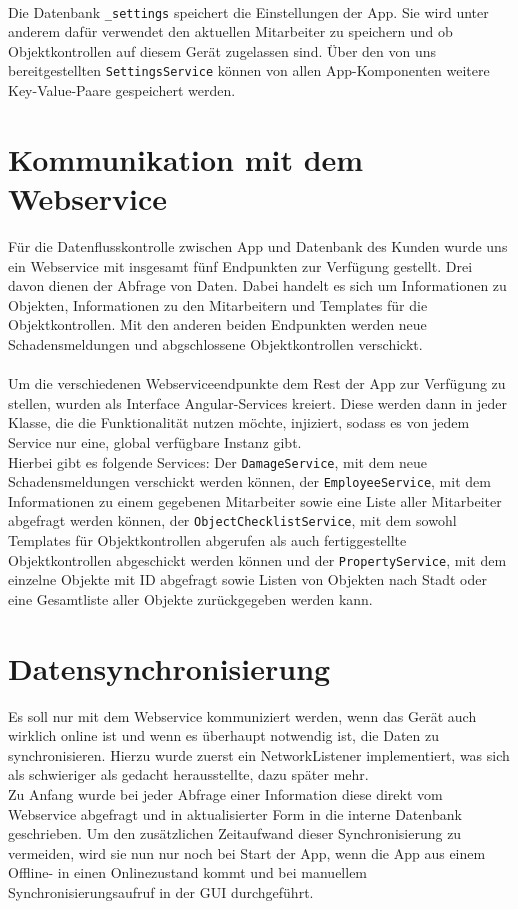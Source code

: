 \documentclass[12pt]{article}
\begin{document}
\paragraph{}Die Datenbank \texttt{\_settings} speichert die Einstellungen der App. Sie wird unter anderem dafür verwendet den aktuellen Mitarbeiter zu speichern und ob Objektkontrollen auf diesem Gerät zugelassen sind. Über den von uns bereitgestellten \texttt{SettingsService} können von allen App-Komponenten weitere Key-Value-Paare gespeichert werden.

\section{Kommunikation mit dem Webservice}
Für die Datenflusskontrolle zwischen App und Datenbank des Kunden wurde uns ein Webservice mit insgesamt fünf Endpunkten zur Verfügung gestellt. Drei davon dienen der Abfrage von Daten. Dabei handelt es sich um Informationen zu Objekten, Informationen zu den Mitarbeitern und Templates für die Objektkontrollen. Mit den anderen beiden Endpunkten werden neue Schadensmeldungen und abgschlossene Objektkontrollen verschickt.

\paragraph{}Um die verschiedenen Webserviceendpunkte dem Rest der App zur Verfügung zu stellen, wurden als Interface Angular-Services kreiert. Diese werden dann in jeder Klasse, die die Funktionalität nutzen möchte, injiziert, sodass es von jedem Service nur eine, global verfügbare Instanz gibt.\\
Hierbei gibt es folgende Services: Der \texttt{DamageService}, mit dem neue Schadensmeldungen verschickt werden können, der \texttt{EmployeeService}, mit dem Informationen zu einem gegebenen Mitarbeiter sowie eine Liste aller Mitarbeiter abgefragt werden können, der \texttt{ObjectChecklistService}, mit dem sowohl Templates für Objektkontrollen abgerufen als auch fertiggestellte Objektkontrollen abgeschickt werden können und der \texttt{PropertyService}, mit dem einzelne Objekte mit ID abgefragt sowie Listen von Objekten nach Stadt oder eine Gesamtliste aller Objekte zurückgegeben werden kann.

\section{Datensynchronisierung}
Es soll nur mit dem Webservice kommuniziert werden, wenn das Gerät auch wirklich online ist und wenn es überhaupt notwendig ist, die Daten zu synchronisieren. Hierzu wurde zuerst ein NetworkListener implementiert, was sich als schwieriger als gedacht herausstellte, dazu später mehr.\\
Zu Anfang wurde bei jeder Abfrage einer Information diese direkt vom Webservice abgefragt und in aktualisierter Form in die interne Datenbank geschrieben. Um den zusätzlichen Zeitaufwand dieser Synchronisierung zu vermeiden, wird sie nun nur noch bei Start der App, wenn die App aus einem Offline- in einen Onlinezustand kommt und bei manuellem Synchronisierungsaufruf in der GUI durchgeführt. 
\end{document}
